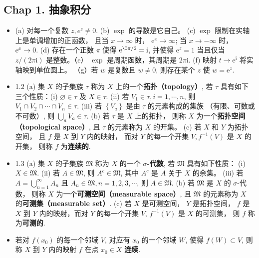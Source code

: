 
\subsection{Chap 1. 抽象积分}
\begin{itemize}
\item (a) 对每一个复数 $z, e^{z} \neq 0$. (b) $\exp$ 的导数是它自己。 (c) $\exp$ 限制在实轴上是单调增加的正函数， 且当 $x \rightarrow \infty$ 时， $\mathrm{e}^{x} \rightarrow \infty$; 当 $x \rightarrow-\infty$ 时， $\mathrm{e}^{x} \rightarrow 0$.
(d) 存在一个正数 $\pi$ 使得 $\mathrm{e}^{\I\pi / 2}=\mathrm{i}$, 并使得 $\mathrm{e}^{z}=1$ 当且仅当 $z /(2 \pi \mathrm{i})$ 是整数。（e） $\exp$ 是周期函数，其周期是 $2 \pi \mathrm{i}$. (f) 映射 $t \rightarrow \mathrm{e}^{\mathrm{i}}$ 将实轴映到单位圆上。 （g）若 $w$ 是复数且 $w \neq 0$, 则存在某个 $z$ 使 $w=\mathrm{e}^{z}$.

\item 1.2 (a) 集 $X$ 的子集族 $\tau$ 称为 $X$ 上的一个\textbf{拓扑（topology）}, 若 $\tau$ 具有如下三个性质：(i) $\varnothing \in \tau$ 及 $X \in \tau$. (ii) 若 $V_{1} \in \tau, i=1, \cdots, n$, 则 $V_{1} \cap V_{2} \cap \cdots \cap V_{n} \in \tau$. (iii) 若 $\left\{V_{a}\right\}$ 是由 $\tau$ 的元素构成的集族 （有限、可数或不可数）, 则 $\bigcup_{a} V_{a} \in \tau$. (b) 若 $\tau$ 是 $X$ 上的拓扑， 则称 $X$ 为一个\textbf{拓扑空间（topological space）}, 且 $\tau$ 的元素称为 $X$ 的开集。 (c) 若 $X$ 和 $Y$ 为拓扑空间， 且 $f$ 是 $X$ 到 $Y$ 内的映射， 而对 $Y$ 的每一个开集 $V, f^{-1}(V)$ 是 $X$ 的开集， 则称 $f$ 为\textbf{连续的}.

\item 1.3 (a) 集 $X$ 的子集族 $\mathfrak{M}$ 称为 $X$ 的一个 \textbf{$\sigma$-代数}, 若 $\mathfrak{M}$ 具有如下性质： (i) $X \in \mathfrak{M}$. (ii) 若 $A \in \mathfrak{M}$, 则 $A^{c} \in \mathfrak{M}$, 其中 $A^{c}$ 是 $A$ 关于 $X$ 的余集。 (iii) 若 $A=\bigcup_{n=1}^{\infty} A_{n}$ 且 $A_{n} \in \mathfrak{M}, n=1,2,3, \cdots$, 则 $A \in \mathfrak{M}$. (b) 若 $\mathfrak{M}$ 是 $X$ 的 $\sigma$-代数， 则称 $X$ 为一个\textbf{可测空间（measurable space）}, 且 $\mathfrak{M}$ 的元素称为 $X$ 的\textbf{可测集（measurable set）}. (c) 若 $X$ 是可测空间， $Y$ 是拓扑空间， $f$ 是 $X$ 到 $Y$ 内的映射，而对 $Y$ 的每一个开集 $V$, $f^{-1}(V)$ 是 $X$ 的可测集， 则 $f$ 称为\textbf{可测的}.

\item 若对 $f\left(x_{0}\right)$ 的每一个邻域 $V$, 对应有 $x_{0}$ 的一个邻域 $W$, 使得 $f(W) \subset V$, 则称 $X$ 到 $Y$ 内的映射 $f$ 在点 $x_{0} \in X$ \textbf{连续}.


\end{itemize}
